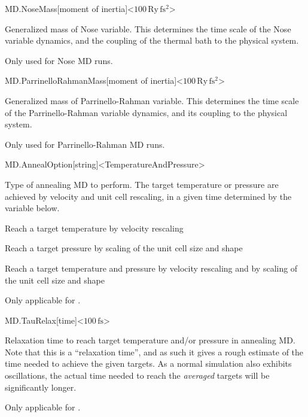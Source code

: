 \begin{fdfentry}{MD.NoseMass}[moment of inertia]<$100\,\mathrm{Ry\,fs^2}$>
  
  Generalized mass of Nose variable.  This determines the time scale
  of the Nose variable dynamics, and the coupling of the thermal bath
  to the physical system.

  Only used for Nose MD runs.

\end{fdfentry}

\begin{fdfentry}{MD.ParrinelloRahmanMass}[moment of inertia]<$100\,\mathrm{Ry\,fs^2}$>

  Generalized mass of Parrinello-Rahman variable.  This determines the
  time scale of the Parrinello-Rahman variable dynamics, and its
  coupling to the physical system.

  Only used for Parrinello-Rahman MD runs.

\end{fdfentry}

\begin{fdfentry}{MD.AnnealOption}[string]<TemperatureAndPressure>
  
  Type of annealing MD to perform. The target temperature or pressure
  are achieved by velocity and unit cell rescaling, in a given time
  determined by the variable  below.
  \begin{fdfoptions}
    \option[Temperature]%
    Reach a target temperature by velocity rescaling

    \option[Pressure]%
    Reach a target pressure by scaling of the unit cell size and shape

    \option[TemperatureandPressure]%
    Reach a target temperature and pressure by velocity rescaling and
    by scaling of the unit cell size and shape
  \end{fdfoptions}

  Only applicable for  .

\end{fdfentry}

\begin{fdfentry}{MD.TauRelax}[time]<$100\,\mathrm{fs}$>
  
  Relaxation time to reach target temperature and/or pressure in
  annealing MD. Note that this is a ``relaxation time'', and as such
  it gives a rough estimate of the time needed to achieve the given
  targets. As a normal simulation also exhibits oscillations, the
  actual time needed to reach the \emph{averaged} targets will be
  significantly longer.

  Only applicable for  .

\end{fdfentry}

